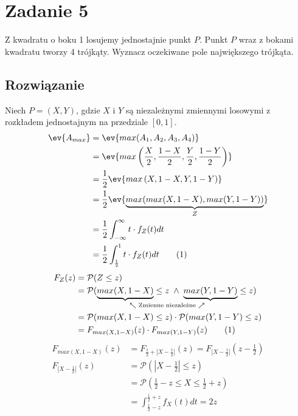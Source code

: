 \section{Zadanie 5}
Z kwadratu o boku 1 losujemy jednostajnie punkt \(P\). Punkt \(P\) wraz z bokami kwadratu tworzy 4 trójkąty. Wyznacz oczekiwane pole największego trójkąta.

\subsection*{Rozwiązanie}
Niech \(P = (X, Y)\), gdzie \(X\) i \(Y\) są niezależnymi zmiennymi losowymi z rozkładem jednostajnym na przedziale \([0, 1]\).
\begin{align*}
	\ev{A_{max}} & = \ev{max(A_1, A_2, A_3, A_4)}                                                \\
	             & = \ev{max\left(\frac{X}{2}, \frac{1-X}{2}, \frac{Y}{2}, \frac{1-Y}{2}\right)} \\
	             & = \frac{1}{2} \ev{max\left(X, 1-X, Y, 1-Y\right)}                             \\
	             & = \frac{1}{2} \ev{\underbrace{max(max(X, 1-X), max(Y, 1-Y))}_Z}               \\
	             & = \frac{1}{2} \int_{-\infty}^{\infty} t \cdot f_Z(t)dt                        \\
	             & = \frac{1}{2} \int_{\frac{1}{2}}^{1} t \cdot f_Z(t)dt
	\stepcounter{equation}\tag{\theequation}\label{myeq1}
\end{align*}
\begin{align*}
	F_Z(z) & = \mathcal{P}(Z \le z)                                                                                                                             \\
	       & = \mathcal{P}(\underset{\nwarrow \text{ Zmienne niezależne } \nearrow}{\underbrace{max(X, 1-X)} \le z \; \land \; \underbrace{max(Y, 1-Y)}} \le z) \\
	       & = \mathcal{P}(max(X, 1-X) \le z) \cdot \mathcal{P}(max(Y, 1-Y) \le z)                                                                              \\
	       & = F_{max(X, 1-X)}(z) \cdot F_{max(Y, 1-Y)}(z)
	\stepcounter{equation}\tag{\theequation}\label{myeq2}
\end{align*}
\begin{align*}
	F_{max(X, 1-X)}(z)                    & = F_{\frac{1}{2} + \left| X - \frac{1}{2} \right|}(z) = F_{\left| X - \frac{1}{2} \right|}\left(z - \frac{1}{2}\right) \\
	F_{\left| X - \frac{1}{2} \right|}(z) & = \mathcal{P}\left(\left|X-\frac{1}{2}\right| \le z\right)                                                             \\
	                                      & = \mathcal{P}\left(\frac{1}{2} - z \le X \le \frac{1}{2} + z\right)                                                    \\
	                                      & = \int_{\frac{1}{2} - z}^{\frac{1}{2} + z}f_X(t)dt = 2z
\end{align*}
